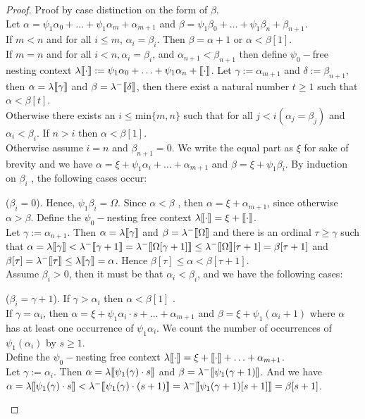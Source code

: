 \documentclass{amsart}
\theoremstyle{plain}
\theoremstyle{plain}
\def\scbrl{[\hspace{-.14em}[}
\def\scbrr{]\hspace{-.14em}]}
\def\scbr#1{\scbrl#1\scbrr}
\newcommand{\Om}{{\Omega}}
\newcommand{\al}{{\alpha}}
\newcommand{\be}{{\beta}}
\newcommand{\ga}{\gamma}
\newcommand{\de}{\delta}
\newcommand{\la}{\lambda}
\def\scbrl{[\hspace{-.14em}[}
\def\scbrr{]\hspace{-.14em}]}
\def\scbr#1{\scbrl#1\scbrr}
\begin{document}
\begin{proof}
Proof by case distinction on the form of $\be$.
\\
Let $\al=\psi_1{\al_0} + \ldots + \psi_1{\al_m} + \al_{m+1} $ and $\be = \psi_1{\be_0}+ \ldots + \psi_1{\be_n} +\be_{n+1}$.\medskip
\\
If $m<n$ and for all $i\leq m$, $\al_i=\be_i$.  Then $\be=\al+1$ or $\al<\be[1]$.\medskip
\\
If $m=n$ and for all $i<n, \al_i=\be_i$, and $\al_{n+1}<\be_{n+1}$ then define $\psi_0-$free nesting context $\la\scbr{\cdot} := \psi_1\al_0 + \ldots + \psi_1\al_n+ \scbr{\cdot}$.
Let $\ga := \al_{m+1}$ and $\de := \be_{n+1}$, then $\al = \la\scbr{\ga}$ and $\be = \la^-\scbr{\de}$, 
then there exist a natural number $t\geq 1$ such that $\al < \be[t]$.\medskip
\\
Otherwise there exists an $i\leq \text{min}\{m,n\}$ such that for all $j<i  (\al_j=\be_j)$ and $\al_i<\be_i$. If $n>i$ then $\al<\be[1]$. \\
Otherwise assume $i=n$ and $\be_{n+1}=0$. We write the equal part as $\xi$ for sake of brevity and we have $\al = \xi + \psi_1\al_i+ \ldots +\al_{m+1} $ and $\be = \xi+ \psi_1\be_i$. 
By induction on $\be_i$ , the following cases occur:
\smallskip
\begin{Cases}
    \item ($\be_i=0$).
    Hence, $\psi_1\be_i=\Om$. Since $\al<\be$ , then $\al = \xi + \al_{m+1}$, since otherwise $\al>\be$.  Define the $\psi_0-$nesting free context  $\la\scbr{\cdot} =  \xi+  \scbr{\cdot}$. \\
    Let $\ga := \al_{n+1}$. Then $\al = \la\scbr{\ga}$ and $\be= \la^-\scbr{\Om}$ 
    and there is an ordinal $\tau \geq \ga$ such that
    $\al =\la\scbr{\ga}<\la^-\scbr{\ga+1} =\la^-\scbr{\Om[\ga+1]} \leq \la^-\scbr{\Om}[\tau+1] =\be[\tau+1]$ and $\be[\tau]= \la^-\scbr{\tau} \leq \la\scbr{\ga} = \al$. Hence $\be[\tau] \leq \al < \be[\tau+1]$.\medskip
    \\
    Assume $\be_i > 0$, then it must be that $\al_i<\be_i$, and we have the following cases:
    \smallskip
    
    \item ($\be_i= \ga+1$).
    If $\ga>\al_i$ then $\al<\be[1]$ .\\%
    If $\ga=\al_i$, then  $\al = \xi+ \psi_1\al_i \cdot s+ \ldots+\al_{m+1} $ and  $\be =\xi+\psi_1(\al_i+1 )$ where $\al$ has at least one occurrence of $\psi_1\al_i$. 
    We count the number of occurrences of $\psi_1(\al_i)$ by $s\geq 1$.\\
    Define the $\psi_0-$nesting free context $\la\scbr{\cdot} =  \xi+  \scbr{\cdot} + \ldots+\al_{m+1} $. \\
    Let $\ga :=\al_i$. Then $\al = \la\scbr{\psi_1(\ga )\cdot s}$ and $\be = \la^-\scbr{\psi_1(\ga+1)}$.
    And we have $\al = \la\scbr{\psi_1(\ga)\cdot s} <\la^-\scbr{\psi_1(\ga)\cdot (s+1)} = \la^-\scbr{\psi_1(\ga+1)[s+1]} =\be[s+1]$.	
    

\end{Cases}
\end{proof}
\end{document}
